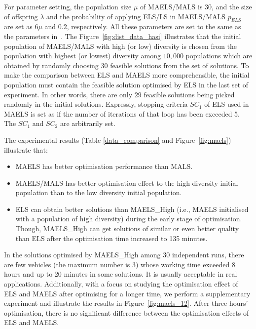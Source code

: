 \documentclass[journal]{IEEEtran}
\begin{document}
For parameter setting, the population size $\mu$ of MAELS/MALS is $30$, and the size of offspring $\lambda$ and the probability of applying ELS/LS in MAELS/MALS $p_{ELS}$ are set as $6\mu$ and 0.2, respectively. All these parameters are set to the same as the parameters in~\cite{tang2009memetic}. The Figure~\ref{fig:dist_data_hasi} illustrates that the initial population of MAELS/MALS with high (or low) diversity is chosen from the population with highest (or lowest) diversity among $10,000$ populations which are obtained by randomly choosing $30$ feasible solutions from the set of solutions. To make the comparison between ELS and MAELS more comprehensible, the initial population must contain the feasible solution optimised by ELS in the last set of experiment. In other words, there are only $29$ feasible solutions being picked randomly in the initial solutions. Expressly, stopping criteria $SC_1$ of ELS used in MAELS is set as if the number of iterations of that loop has been exceeded 5. The $SC_1$ and $SC_2$ are arbitrarily set.

The experimental results (Table \ref{data_comparison} and Figure~\ref{fig:maels}) illustrate that:
\begin{itemize}%
	\item \label{ma_ob1}MAELS has better optimisation performance than MALS.
	\item \label{ma_ob2}MAELS/MALS has better optimisation effect to the high diversity initial population than to the low diversity initial population.
	\item \label{ma_ob3}ELS can obtain better solutions than MAELS\_High (i.e., MAELS initialised with a population of high diversity) during the early stage of optimisation. Though, MAELS\_High can get solutions of similar or even better quality than ELS after the optimisation time increased to 135 minutes.
\end{itemize}

In the solutions optimised by MAELS\_High among 30 independent runs, there are few vehicles (the maximum number is $3$) whose working time exceeded 8 hours and up to 20 minutes in some solutions. It is usually acceptable in real applications. Additionally, with a focus on studying the optimisation effect of ELS and MAELS after optimising for a longer time, we perform a supplementary experiment and illustrate the results in Figure~\ref{fig:maels_12}. After three hours' optimisation, there is no significant difference between the optimisation effects of ELS and MAELS.
\end{document}
